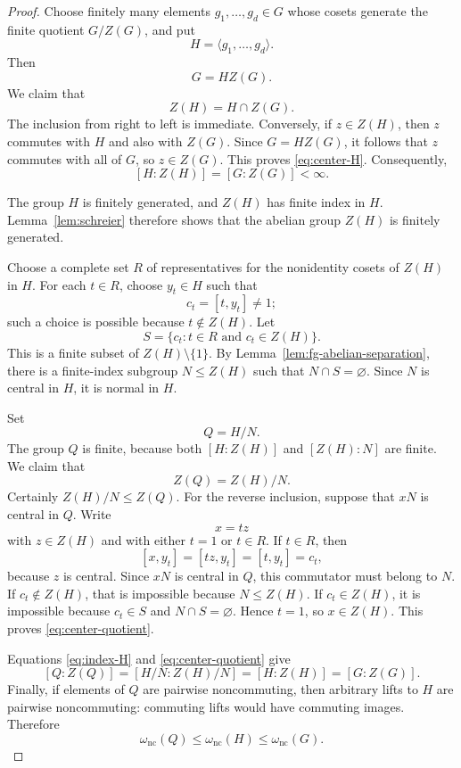 \documentclass[11pt]{article}
\theoremstyle{definition}
\newcommand{\nc}{\omega_{\mathrm{nc}}}
\begin{document}
\begin{proof}
Choose finitely many elements $g_1,\dots,g_d\in G$ whose cosets generate the
finite quotient $G/Z(G)$, and put
\[
 H=\langle g_1,\dots,g_d\rangle.
\]
Then
\[
 G=HZ(G).
\]
We claim that
\begin{equation}\label{eq:center-H}
 Z(H)=H\cap Z(G).
\end{equation}
The inclusion from right to left is immediate.  Conversely, if $z\in Z(H)$,
then $z$ commutes with $H$ and also with $Z(G)$.  Since $G=HZ(G)$, it follows
that $z$ commutes with all of $G$, so $z\in Z(G)$.  This proves
\eqref{eq:center-H}.  Consequently,
\begin{equation}\label{eq:index-H}
 [H:Z(H)]=[G:Z(G)]<\infty.
\end{equation}

The group $H$ is finitely generated, and $Z(H)$ has finite index in $H$.
Lemma~\ref{lem:schreier} therefore shows that the abelian group $Z(H)$ is
finitely generated.

Choose a complete set $R$ of representatives for the nonidentity cosets of
$Z(H)$ in $H$.  For each $t\in R$, choose $y_t\in H$ such that
\[
 c_t=[t,y_t]\ne1;
\]
such a choice is possible because $t\notin Z(H)$.  Let
\[
 S=\{c_t:t\in R\text{ and }c_t\in Z(H)\}.
\]
This is a finite subset of $Z(H)\setminus\{1\}$.  By
Lemma~\ref{lem:fg-abelian-separation}, there is a finite-index subgroup
$N\le Z(H)$ such that $N\cap S=\varnothing$.  Since $N$ is central in $H$, it
is normal in $H$.

Set
\[
 Q=H/N.
\]
The group $Q$ is finite, because both $[H:Z(H)]$ and $[Z(H):N]$ are finite.
We claim that
\begin{equation}\label{eq:center-quotient}
 Z(Q)=Z(H)/N.
\end{equation}
Certainly $Z(H)/N\le Z(Q)$.  For the reverse inclusion, suppose that $xN$ is
central in $Q$.  Write
\[
 x=tz
\]
with $z\in Z(H)$ and with either $t=1$ or $t\in R$.  If $t\in R$, then
\[
 [x,y_t]=[tz,y_t]=[t,y_t]=c_t,
\]
because $z$ is central.  Since $xN$ is central in $Q$, this commutator must
belong to $N$.  If $c_t\notin Z(H)$, that is impossible because
$N\le Z(H)$.  If $c_t\in Z(H)$, it is impossible because $c_t\in S$ and
$N\cap S=\varnothing$.  Hence $t=1$, so $x\in Z(H)$.  This proves
\eqref{eq:center-quotient}.

Equations \eqref{eq:index-H} and \eqref{eq:center-quotient} give
\[
 [Q:Z(Q)]
 =[H/N:Z(H)/N]
 =[H:Z(H)]
 =[G:Z(G)].
\]
Finally, if elements of $Q$ are pairwise noncommuting, then arbitrary lifts
to $H$ are pairwise noncommuting: commuting lifts would have commuting images.
Therefore
\[
 \nc(Q)\le\nc(H)\le\nc(G).
\]
\end{proof}
\end{document}
